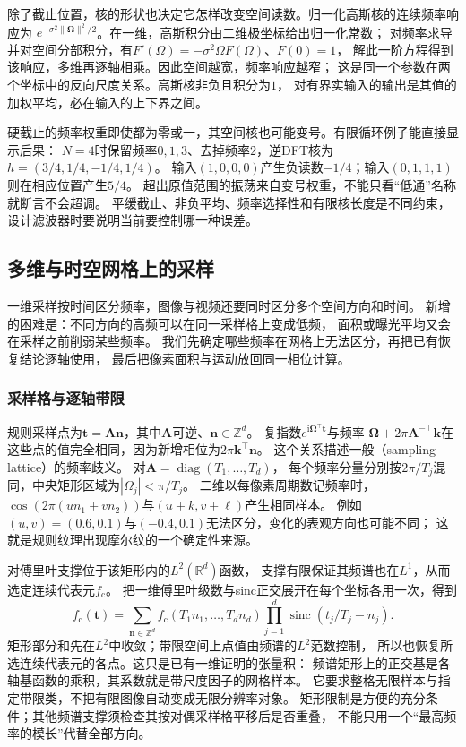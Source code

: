 除了截止位置，核的形状也决定它怎样改变空间读数。归一化高斯核的连续频率响应为
$e^{-\sigma^2\|\bm\Omega\|^2/2}$。在一维，高斯积分由二维极坐标给出归一化常数；
对频率求导并对空间分部积分，有$F'(\Omega)=-\sigma^2\Omega F(\Omega)$、$F(0)=1$，
解此一阶方程得到该响应，多维再逐轴相乘。因此空间越宽，频率响应越窄；
这是同一个参数在两个坐标中的反向尺度关系。高斯核非负且积分为$1$，
对有界实输入的输出是其值的加权平均，必在输入的上下界之间。

硬截止的频率权重即使都为零或一，其空间核也可能变号。有限循环例子能直接显示后果：
$N=4$时保留频率$0,1,3$、去掉频率$2$，逆DFT核为$h=(3/4,1/4,-1/4,1/4)$。
输入$(1,0,0,0)$产生负读数$-1/4$；输入$(0,1,1,1)$则在相应位置产生$5/4$。
超出原值范围的振荡来自变号权重，不能只看“低通”名称就断言不会超调。
平缓截止、非负平均、频率选择性和有限核长度是不同约束，
设计滤波器时要说明当前要控制哪一种误差。

\subsection{多维与时空网格上的采样}
\label{sec:signal-multidimensional-sampling}

一维采样按时间区分频率，图像与视频还要同时区分多个空间方向和时间。
新增的困难是：不同方向的高频可以在同一采样格上变成低频，
面积或曝光平均又会在采样之前削弱某些频率。
我们先确定哪些频率在网格上无法区分，再把已有恢复结论逐轴使用，
最后把像素面积与运动放回同一相位计算。

\subsubsection{采样格与逐轴带限}
规则采样点为$\bm t=\bm A\bm n$，其中$\bm A$可逆、$\bm n\in\mathbb Z^d$。
复指数$e^{\mathrm i\bm\Omega^\top\bm t}$与频率
$\bm\Omega+2\pi\bm A^{-\top}\bm k$在这些点的值完全相同，因为新增相位为$2\pi\bm k^\top\bm n$。
这个关系描述一般（sampling lattice）的频率歧义。
对$\bm A=\operatorname{diag}(T_1,\ldots,T_d)$，
每个频率分量分别按$2\pi/T_j$混同，中央矩形区域为$|\Omega_j|<\pi/T_j$。
二维以每像素周期数记频率时，$\cos(2\pi(un_1+vn_2))$与$(u+k,v+\ell)$产生相同样本。
例如$(u,v)=(0.6,0.1)$与$(-0.4,0.1)$无法区分，变化的表观方向也可能不同；
这就是规则纹理出现摩尔纹的一个确定性来源。

对傅里叶支撑位于该矩形内的$L^2(\mathbb R^d)$函数，
支撑有限保证其频谱也在$L^1$，从而选定连续代表元$f_{\mathrm c}$。
把一维傅里叶级数与sinc正交展开在每个坐标各用一次，得到
\begin{equation}
 f_{\mathrm c}(\bm t)=
 \sum_{\bm n\in\mathbb Z^d}
 f_{\mathrm c}(T_1n_1,\ldots,T_dn_d)
 \prod_{j=1}^d\operatorname{sinc}(t_j/T_j-n_j).
 \label{eq:signal-multidimensional-sinc}
\end{equation}
矩形部分和先在$L^2$中收敛；带限空间上点值由频谱的$L^2$范数控制，
所以也恢复所选连续代表元的各点。这只是已有一维证明的张量积：
频谱矩形上的正交基是各轴基函数的乘积，其系数就是带尺度因子的网格样本。
它要求整格无限样本与指定带限类，不把有限图像自动变成无限分辨率对象。
矩形限制是方便的充分条件；其他频谱支撑须检查其按对偶采样格平移后是否重叠，
不能只用一个“最高频率的模长”代替全部方向。

